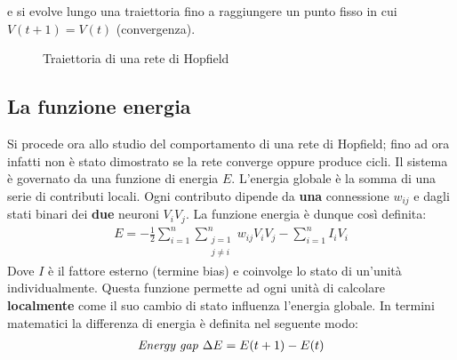  e si evolve lungo una traiettoria fino a raggiungere un punto fisso in cui $V(t+1) = V(t)$ (convergenza).
 \begin{figure}[h!]
     \centering
     \caption{Traiettoria di una rete di Hopfield}
 \end{figure}

\subsection{La funzione energia} %
\label{sub:funzione_energia}
Si procede ora allo studio del comportamento di una rete di Hopfield; fino ad ora infatti non è stato dimostrato se la rete converge oppure produce cicli. Il sistema è governato da una funzione di energia $E$. L'energia globale è la somma di una serie di contributi locali. Ogni contributo dipende da \textbf{una} connessione $w_{ij}$ e dagli stati binari dei \textbf{due} neuroni $V_i V_j$. La funzione energia è dunque così definita:
\begin{align}
    E = - \frac{1}{2} \sum_{i=1}^n \sum_{\substack{j=1 \\ j \neq i}}^n w_{ij} V_i V_j - \sum_{i=1}^n I_i V_i\label{eq:energy}
\end{align}
Dove $I$ è il fattore esterno (termine bias) e coinvolge lo stato di un'unità individualmente. Questa funzione permette ad ogni unità di calcolare \textbf{localmente} come il suo cambio di stato influenza l'energia globale. In termini matematici la differenza di energia è definita nel seguente modo:
\begin{align}
    \emph{Energy gap }\Delta E = E(t + 1) - E(t)
\end{align}

\newpage

